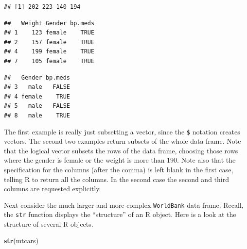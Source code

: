 \documentclass[
]{krantz}
\newenvironment{Shaded}{\begin{snugshade}}{\end{snugshade}}
\newcommand{\DecValTok}[1]{\textcolor[rgb]{0.00,0.00,0.81}{#1}}
\newcommand{\KeywordTok}[1]{\textcolor[rgb]{0.13,0.29,0.53}{\textbf{#1}}}
\newcommand{\NormalTok}[1]{#1}
\newcommand{\OperatorTok}[1]{\textcolor[rgb]{0.81,0.36,0.00}{\textbf{#1}}}
\newcommand{\StringTok}[1]{\textcolor[rgb]{0.31,0.60,0.02}{#1}}
\begin{document}
\begin{verbatim}
## [1] 202 223 140 194
\end{verbatim}

\begin{Shaded}
\end{Shaded}

\begin{verbatim}
##   Weight Gender bp.meds
## 1    123 female    TRUE
## 2    157 female    TRUE
## 4    199 female    TRUE
## 7    105 female    TRUE
\end{verbatim}

\begin{Shaded}
\end{Shaded}

\begin{verbatim}
##   Gender bp.meds
## 3   male   FALSE
## 4 female    TRUE
## 5   male   FALSE
## 8   male    TRUE
\end{verbatim}

The first example is really just subsetting a vector, since the \texttt{\$} notation creates vectors. The second two examples return subsets of the whole data frame. Note that the logical vector subsets the rows of the data frame, choosing those rows where the gender is female or the weight is more than 190. Note also that the specification for the columns (after the comma) is left blank in the first case, telling R to return all the columns. In the second case the second and third columns are requested explicitly.

Next consider the much larger and more complex \texttt{WorldBank} data frame. Recall, the \texttt{str} function displays the ``structure'' of an R object. Here is a look at the structure of several R objects.

\begin{Shaded}
\begin{Highlighting}[]
\KeywordTok{str}\NormalTok{(mtcars)}
\end{Highlighting}
\end{Shaded}
\end{document}
